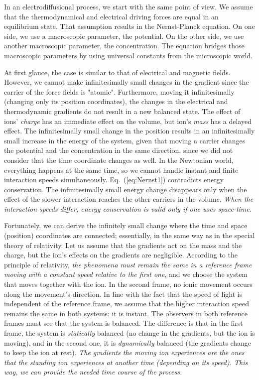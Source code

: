 In an electrodiffusional process, we start with the same
point of view. We assume that the thermodynamical and electrical driving
forces are equal in an equilibrium state. That assumption results
in the Nernst-Planck equation. On one side, we use a macroscopic parameter,
the potential. On the other side, we use another macroscopic
parameter, the concentration. The equation bridges those
macroscopic parameters by using universal constants from the microscopic world. 

At first glance, the case is similar to that of electrical and magnetic fields.
However, we cannot
make infinitesimally small changes in the gradient since the carrier
of the force fields is "atomic". Furthermore, moving it infinitesimally
(changing only its position coordinates), the changes in the electrical
and thermodynamic gradients do not result in a new balanced state.
The effect of ions' \emph{charge} has an immediate effect on the volume,
but ion's \emph{mass} has a delayed effect. The infinitesimally small
change in the position results in an infinitesimally small increase
in the energy of the system, given that moving a carrier changes the
potential and the concentration in the same direction, since we did not
consider that the
time coordinate changes as well.
In the Newtonian world, everything
happens at the same time, so we cannot handle instant and finite interaction
speeds simultaneously.
Eq.~(\ref{eq:Nernst1}) contradicts energy conservation.
The infinitesimally small energy change disappears
only when the effect of the slower interaction reaches the other carriers in the
volume. \textit{When the interaction speeds differ, energy conservation is valid only if one uses space-time.}




Fortunately, we can derive the infinitely small change where
the time and space (position) coordinates are connected; essentially, in the same way as in
the special theory of relativity. Let us assume that the gradients
act on the mass and the charge, but the ion's effects on the gradients
are negligible. According to the principle of relativity,
\emph{the phenomena must remain the same in a reference frame moving with a constant speed} \emph{relative to the first one},
and we choose the
system that moves together with the ion. In the second frame, no ionic
movement occurs along the movement's direction. 
In line with the fact that the speed of light is independent of the reference frame,
we assume that the higher interaction speed remains the same in both
systems: it is instant. 
The observers in both reference frames must see that the
system is balanced. The difference is that in the first frame, the
system is \textit{statically} balanced (no change in the gradients, but the
ion is moving), and in the second one, it is \textit{dynamically} balanced (the
gradients change to keep the ion at rest).
\emph{The gradients the
moving ion experiences are the ones that the standing ion experiences
at another time (depending on its speed). This way, we can provide
the needed time course of the process.} 

